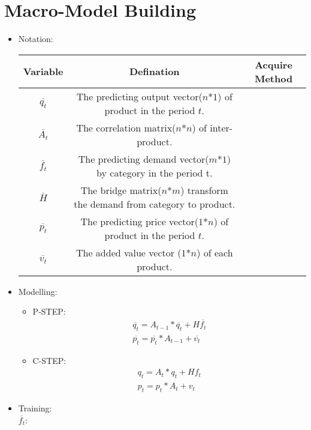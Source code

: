 \documentclass{article}
\theoremstyle{definition}
\theoremstyle{definition}
\theoremstyle{remark}
\begin{document}
\section*{Macro-Model Building}
\begin{itemize}
	\item Notation:
		\begin{table}[!ht]
			\centering
			\begin{tabular}{|c|c|c|}
				\hline
				Variable & Defination & Acquire Method\\
				\hline
				$\overline{q_t}$ & The predicting output vector($n$*$1$) of product in the period $t$.& \\
				$\overline{A_t}$ & The correlation matrix($n$*$n$) of inter-product. & \\
				$\overline{f_t}$ & The predicting demand vector($m$*$1$) by category in the period t.  &\\
				$\overline{H}$ & The bridge matrix($n$*$m$) transform the demand from category to product. &\\
				$\overline{p_t}$ & The predicting price vector($1$*$n$) of product in the period $t$. & \\
				$\overline{v_t}$ & The added value vector ($1$*$n$) of each product. &\\
				\hline
			\end{tabular}
		\end{table}
	\item Modelling:
	\begin{itemize}
		\item P-STEP:
		\begin{equation*}
			\begin{aligned}
				\overline{q_t} = A_{t-1} * \overline{q_t} + H\overline{f_t} \\
				\overline{p_t} = \overline{p_t} * A_{t-1} + \overline{v_t}
			\end{aligned}
		\end{equation*}
		\item C-STEP:
		\begin{equation*}
			\begin{aligned}
				q_t = A_{t} * q_t + Hf_t \\
				p_t = p_t * A_{t} + v_t
			\end{aligned}
		\end{equation*}		
	\end{itemize}
	\item Training: \\
		$\overline{f_t}$: 
		\begin{itemize}

\end{itemize}
\end{itemize}
\end{document}

